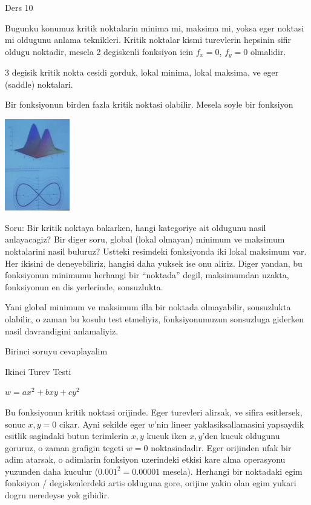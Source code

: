 \documentclass[12pt,fleqn]{article}
\begin{document}
Ders 10

Bugunku konumuz kritik noktalarin minima mi, maksima mi, yoksa eger noktasi
mi oldugunu anlama teknikleri. Kritik noktalar kismi turevlerin hepsinin
sifir oldugu noktadir, mesela 2 degiskenli fonksiyon icin $f_x=0$, $f_y=0$
olmalidir. 

3 degisik kritik nokta cesidi gorduk, lokal minima, lokal maksima, ve
eger (saddle) noktalari. 

Bir fonksiyonun birden fazla kritik noktasi olabilir. Mesela soyle bir
fonksiyon

\includegraphics[height=4cm]{10_1.png}

Soru: Bir kritik noktaya bakarken, hangi kategoriye ait oldugunu nasil
anlayacagiz? Bir diger soru, global (lokal olmayan) minimum ve maksimum
noktalarini nasil buluruz?  Ustteki resimdeki fonksiyonda iki lokal
maksimum var. Her ikisini de deneyebiliriz, hangisi daha yuksek ise onu
aliriz. Diger yandan, bu fonksiyonun minimumu herhangi bir ``noktada'' degil,
maksimumdan uzakta, fonksiyonun en dis yerlerinde, sonsuzlukta. 

Yani global minimum ve maksimum illa bir noktada olmayabilir, sonsuzlukta
olabilir, o zaman bu kosulu test etmeliyiz, fonksiyonumuzun sonsuzluga
giderken nasil davrandigini anlamaliyiz.

Birinci soruyu cevaplayalim

Ikinci Turev Testi

$w = ax^2 + bxy + cy^2$

Bu fonksiyonun kritik noktasi orijinde. Eger turevleri alirsak, ve sifira
esitlersek, sonuc $x,y=0$ cikar. Ayni sekilde eger $w$'nin lineer
yaklasiksallamasini yapsaydik esitlik sagindaki butun terimlerin $x,y$
kucuk iken $x,y$'den kucuk oldugunu goruruz, o zaman grafigin tegeti $w=0$
noktasindadir. Eger orijinden ufak bir adim atarsak, o adimlarin fonksiyon
uzerindeki etkisi kare alma operasyonu yuzunden daha kuculur ($0.001^2 =
0.00001$ 
mesela). Herhangi bir noktadaki egim fonksiyon / degiskenlerdeki artis
olduguna gore, orijine yakin olan egim yukari dogru neredeyse yok gibidir. 
\end{document}
